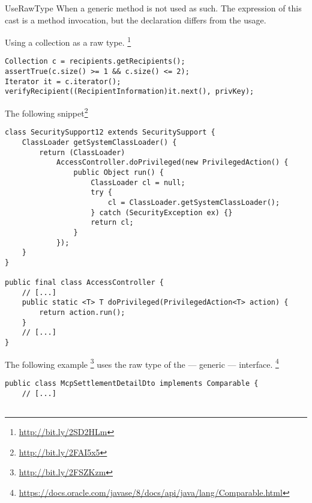 \begin{pattern}{UseRawType}
When a generic method is not used as such.
The expression of this cast is a method invocation,
but the declaration differs from the usage.

\instances{}

Using a collection as a raw type.
\footnote{\url{http://bit.ly/2SD2HLm}}

\begin{verbatim}
Collection c = recipients.getRecipients();
assertTrue(c.size() >= 1 && c.size() <= 2);
Iterator it = c.iterator();
verifyRecipient((RecipientInformation)it.next(), privKey);
\end{verbatim}


The following snippet\footnote{\url{http://bit.ly/2FAI5x5}}


\begin{verbatim}
class SecuritySupport12 extends SecuritySupport {
    ClassLoader getSystemClassLoader() {
        return (ClassLoader)
            AccessController.doPrivileged(new PrivilegedAction() {
                public Object run() {
                    ClassLoader cl = null;
                    try {
                        cl = ClassLoader.getSystemClassLoader();
                    } catch (SecurityException ex) {}
                    return cl;
                }
            });
    }
}

public final class AccessController {
    // [...]
    public static <T> T doPrivileged(PrivilegedAction<T> action) {
        return action.run();
    }
    // [...]
}
\end{verbatim}

The following example%
\footnote{\url{http://bit.ly/2FSZKzm}}
uses the raw type of the  --- generic --- interface.%
\footnote{\url{https://docs.oracle.com/javase/8/docs/api/java/lang/Comparable.html}}

\begin{verbatim}
public class McpSettlementDetailDto implements Comparable {
    // [...]


\end{verbatim}
\end{pattern}

